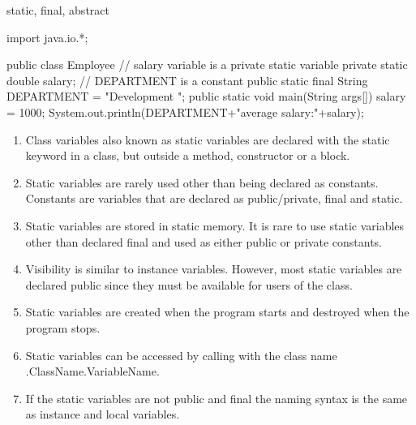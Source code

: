 \documentclass[11pt]{beamer}
\begin{document}
\begin{frame}{static, final, abstract}

\begin{java}

import java.io.*;

public class Employee{
// salary variable is a private static variable
private static double salary;
// DEPARTMENT is a constant
public static final String DEPARTMENT = "Development ";
public static void main(String args[]){
salary = 1000;
System.out.println(DEPARTMENT+"average salary:"+salary);
}
}
\end{java}
\begin{enumerate}
\item Class variables also known as static variables are declared with the static keyword in a class, but outside a method, constructor or a block.
\item Static variables are rarely used other than being declared as constants. Constants are variables that are declared as public/private, final and static. 
\item Static variables are stored in static memory. It is rare to use static variables other than declared final and used as either public or private constants.
\item Visibility is similar to instance variables. However, most static variables are declared public since they must be available for users of the class.
\item Static variables are created when the program starts and destroyed when the program stops.
\item Static variables can be accessed by calling with the class name .ClassName.VariableName. 
\item If the static variables are not public and final the naming syntax is the same as instance and local variables.  
\end{enumerate}


\end{frame}
\end{document}
